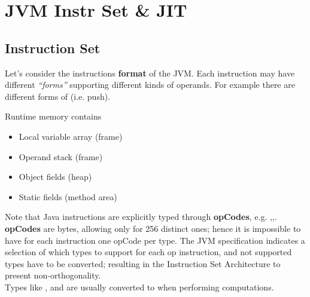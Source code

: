 \chapter{JVM Instr Set \& JIT}
\section{Instruction Set}


Let's consider the instructions \textbf{format} of the JVM.
Each instruction may have different \textit{``forms''} supporting different kinds of operands.
For example there are different forms of  (i.e. push).

{Runtime memory contains\ns
\begin{itemize}
	\item Local variable array (frame)
	\item Operand stack (frame)
	\item Object fields (heap)
	\item Static fields (method area)
\end{itemize}}

Note that Java instructions are explicitly typed through \textbf{opCodes}, e.g. ,,.\\
\textbf{opCodes} are bytes, allowing only for 256 distinct ones;
hence it is impossible to have for each instruction one opCode per type.
The JVM specification indicates a selection of which types to support for each op instruction, and not supported types have to be converted; resulting in the Instruction Set Architecture to present non-orthogonality.\\
Types like ,  and  are usually converted to  when performing computations.


